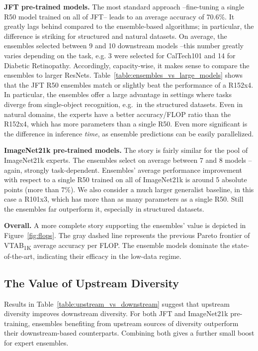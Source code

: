 \documentclass{article} \usepackage{iclr2021_conference,times}
\begin{document}
\textbf{JFT pre-trained models.} The most standard approach --fine-tuning a single R50 model trained on all of JFT-- leads to an average accuracy of 70.6\%. It greatly lags behind compared to the ensemble-based algorithms; in particular, the difference is striking for structured and natural datasets.
On average, the ensembles selected between 9 and 10 downstream models --this number greatly varies depending on the task, e.g. 3 were selected for CalTech101 and 14 for Diabetic Retinopathy.
Accordingly, capacity-wise, it makes sense to compare the ensembles to larger ResNets. 
Table~\ref{table:ensembles_vs_large_models} shows that the JFT R50 ensembles match or slightly beat the performance of a R152x4. In particular, the ensembles offer a large advantage in settings where tasks diverge from single-object recognition, e.g.\ in the structured datasets.
Even in natural domains, the experts have a better accuracy/FLOP ratio than the R152x4, which has  more parameters than a single R50.
Even more significant is the difference in inference \emph{time}, as ensemble predictions can be easily parallelized.

\textbf{ImageNet21k pre-trained models.}
The story is fairly similar for the pool of ImageNet21k experts.
The ensembles select on average between 7 and 8 models --again, strongly task-dependent.
Ensembles' average performance improvement with respect to a single R50 trained on all of ImageNet21k is around 5 absolute points (more than 7\%).
We also consider a much larger generalist baseline, in this case a R101x3, which has more than  as many parameters as a single R50. Still the ensembles far outperform it, especially in structured datasets.

\textbf{Overall.} A more complete story supporting the ensembles' value is depicted in Figure~\ref{fig:flops}.
The gray dashed line represents the previous Pareto frontier of VTAB\textsubscript{1K} average accuracy per FLOP. The ensemble models 
dominate the state-of-the-art, indicating their efficacy in the low-data regime.

\subsection{The Value of Upstream Diversity}
Results in Table~\ref{table:upstream_vs_downstream} suggest that upstream diversity improves downstream diversity. 
For both JFT and ImageNet21k pre-training, ensembles benefiting from upstream sources of diversity outperform their downstream-based counterparts. Combining both gives a further small boost for expert ensembles.
\end{document}
